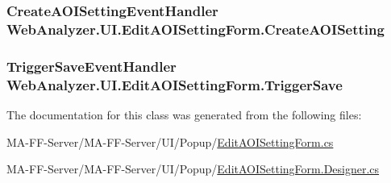 \subsubsection[{Create\+A\+O\+I\+Setting}]{\setlength{\rightskip}{0pt plus 5cm}Create\+A\+O\+I\+Setting\+Event\+Handler Web\+Analyzer.\+U\+I.\+Edit\+A\+O\+I\+Setting\+Form.\+Create\+A\+O\+I\+Setting}\label{class_web_analyzer_1_1_u_i_1_1_edit_a_o_i_setting_form_a1841845af65ba0e224742710ddefb772}
\hypertarget{class_web_analyzer_1_1_u_i_1_1_edit_a_o_i_setting_form_a5333229783b91948ba94f0ed0a947c6d}{}
\subsubsection[{Trigger\+Save}]{\setlength{\rightskip}{0pt plus 5cm}Trigger\+Save\+Event\+Handler Web\+Analyzer.\+U\+I.\+Edit\+A\+O\+I\+Setting\+Form.\+Trigger\+Save}\label{class_web_analyzer_1_1_u_i_1_1_edit_a_o_i_setting_form_a5333229783b91948ba94f0ed0a947c6d}


The documentation for this class was generated from the following files\+:\begin{DoxyCompactItemize}
\item 
M\+A-\/\+F\+F-\/\+Server/\+M\+A-\/\+F\+F-\/\+Server/\+U\+I/\+Popup/\hyperlink{_edit_a_o_i_setting_form_8cs}{Edit\+A\+O\+I\+Setting\+Form.\+cs}\item 
M\+A-\/\+F\+F-\/\+Server/\+M\+A-\/\+F\+F-\/\+Server/\+U\+I/\+Popup/\hyperlink{_edit_a_o_i_setting_form_8_designer_8cs}{Edit\+A\+O\+I\+Setting\+Form.\+Designer.\+cs}\end{DoxyCompactItemize}
